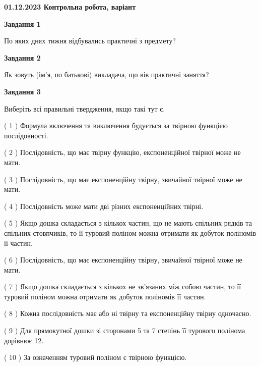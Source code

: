 \documentclass[12pt, ukrainian]{article}
\begin{document}
\begin {large}

\textbf{01.12.2023 Контрольна робота, варіант  }\par


{
{\begin {center}\textbf{Завдання 1}\end {center}}\par
По яких днях тижня відбувались практичні з предмету?\par
{\begin {center}\textbf{Завдання 2}\end {center}}\par
Як зовуть (ім'я, по батькові) викладача, що вів практичні заняття?\par
{\begin {center}\textbf{Завдання 3}\end {center}}\par
Виберіть всі правильні твердження, якщо такі тут є.\par
\vspace{2mm}
( 1 ) Формула включення та виключення будується за твірною функцією послідовності.%

( 2 ) Послідовність, що має твірну функцію, експоненційної твірної може не мати.%

( 3 ) Послідовність, що має експоненційну твірну, звичайної твірної може не мати.%

( 4 ) Послідовність може мати дві різних експоненційних твірні.%

( 5 ) Якщо дошка складається з кількох частин, що не мають спільних рядків та спільних стовпчиків, то її туровий поліном можна отримати як добуток поліномів її частин.%

( 6 ) Послідовність, що має експоненційну твірну, звичайної твірної може не мати.%

( 7 ) Якщо дошка складається з кількох не зв’язаних між собою частин, то її туровий поліном можна отримати як добуток поліномів її частин.%

( 8 ) Кожна послідовність має або ні твірну та експоненційну твірну одночасно.%

( 9 ) Для прямокутної дошки зі сторонами 5 та 7 степінь її турового полінома дорівнює 12.%

( 10 ) За означенням туровий поліном є твірною функцією.%
}
\end {large}

\vspace{4mm}
\newpage
\end{document}
